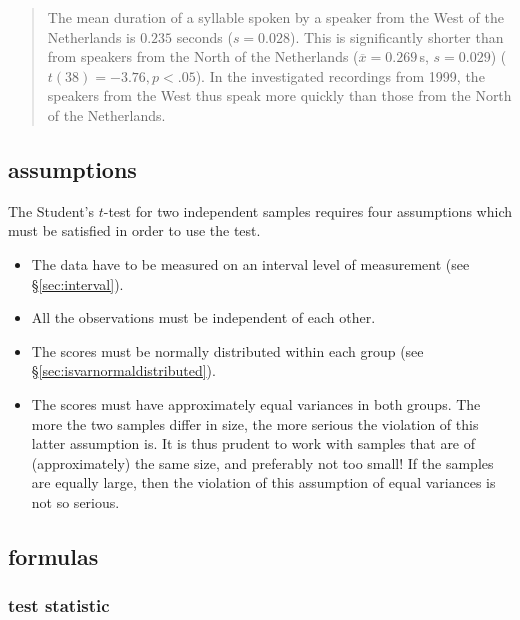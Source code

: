 \documentclass[
]{book}
\begin{document}
\begin{quote}
The mean duration of a syllable spoken by a speaker from the West
of the Netherlands is \(0.235\) seconds (\(s=0.028\)). This is
significantly shorter than from speakers from the North of the Netherlands
(\(\overline{x}=0.269\) s, \(s=0.029\)) (\(t(38)=-3.76, p<.05\)). In the
investigated recordings from 1999, the speakers from the West thus
speak more quickly than those from the North of the Netherlands.
\end{quote}

\hypertarget{sec:ttest-unpaired-assumptions}{%
\subsection{assumptions}\label{sec:ttest-unpaired-assumptions}}

The Student's \(t\)-test for two independent samples requires four assumptions
which must be satisfied in order to use the test.

\begin{itemize}
\item
  The data have to be measured on an interval level of measurement (see
  §\ref{sec:interval}).
\item
  All the observations must be independent of each other.
\item
  The scores must be normally distributed within each group (see
  §\ref{sec:isvarnormaldistributed}).
\item
  The scores must have approximately equal variances in both groups.
  The more the two samples differ in size, the more
  serious the violation of this latter assumption is. It is thus prudent
  to work with samples that are of (approximately) the same size, and preferably not too small! If the samples are equally large, then the violation of this assumption of equal
  variances is not so serious.
\end{itemize}

\hypertarget{sec:ttest-formulas}{%
\subsection{formulas}\label{sec:ttest-formulas}}

\hypertarget{test-statistic}{%
\subsubsection{test statistic}\label{test-statistic}}
\end{document}
